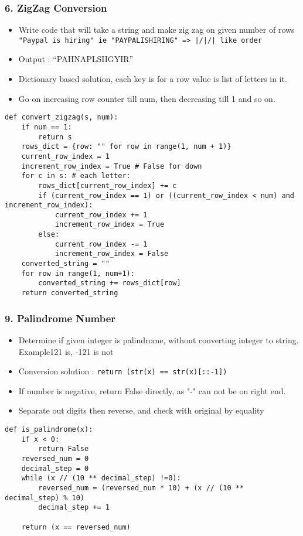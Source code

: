 \begin{frame}[fragile]\frametitle{6. ZigZag Conversion}


	\begin{itemize}
	\item Write code that will take a string and make zig zag on given number of rows
\lstinline{"Paypal is hiring" ie "PAYPALISHIRING" => |/|/| like order}
	\item Output : ``PAHNAPLSIIGYIR''
	\item Dictionary based solution, each key is for a row value is list of letters in it.
	\item Go on increasing row counter till num, then decreasing till 1 and so on.
	\end{itemize}

		\begin{lstlisting}[basicstyle=\scriptsize]
def convert_zigzag(s, num):
    if num == 1:
        return s
    rows_dict = {row: "" for row in range(1, num + 1)}
    current_row_index = 1
    increment_row_index = True # False for down
    for c in s: # each letter:
        rows_dict[current_row_index] += c
        if (current_row_index == 1) or ((current_row_index < num) and increment_row_index):
            current_row_index += 1
            increment_row_index = True
        else:
            current_row_index -= 1
            increment_row_index = False
    converted_string = ""
    for row in range(1, num+1):
        converted_string += rows_dict[row]
    return converted_string		
				\end{lstlisting}		

	
\end{frame}

\begin{frame}[fragile]\frametitle{9. Palindrome Number}


	\begin{itemize}
	\item Determine if given integer is palindrome, without converting integer to string. Example121 is, -121 is not
	\item Conversion solution : \lstinline{return (str(x) == str(x)[::-1])}
	\item If number is negative, return False directly, as "-" can not be on right end.
	\item Separate out digits then reverse, and check with original by equality
	\end{itemize}

		\begin{lstlisting}[basicstyle=\scriptsize]
def is_palindrome(x):
    if x < 0:
        return False
    reversed_num = 0
    decimal_step = 0
    while (x // (10 ** decimal_step) !=0):
        reversed_num = (reversed_num * 10) + (x // (10 ** decimal_step) % 10)
        decimal_step += 1

    return (x == reversed_num)
				\end{lstlisting}		

	
\end{frame}

